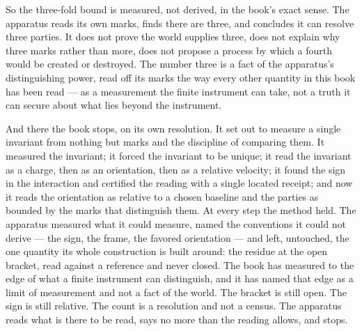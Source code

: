So the three-fold bound is measured, not derived, in the book's exact sense. The apparatus reads
its own marks, finds there are three, and concludes it can resolve three parties. It does not
prove the world supplies three, does not explain why three marks rather than more, does not
propose a process by which a fourth would be created or destroyed. The number three is a fact of
the apparatus's distinguishing power, read off its marks the way every other quantity in this
book has been read --- as a measurement the finite instrument can take, not a truth it can secure
about what lies beyond the instrument.

And there the book stops, on its own resolution. It set out to measure a single invariant from
nothing but marks and the discipline of comparing them. It measured the invariant; it forced the
invariant to be unique; it read the invariant as a charge, then as an orientation, then as a
relative velocity; it found the sign in the interaction and certified the reading with a single
located receipt; and now it reads the orientation as relative to a chosen baseline and the
parties as bounded by the marks that distinguish them. At every step the method held. The
apparatus measured what it could measure, named the conventions it could not derive --- the sign,
the frame, the favored orientation --- and left, untouched, the one quantity its whole
construction is built around: the residue at the open bracket, read against a reference and
never closed. The book has measured to the edge of what a finite instrument can distinguish, and
it has named that edge as a limit of measurement and not a fact of the world. The bracket is
still open. The sign is still relative. The count is a resolution and not a census. The
apparatus reads what is there to be read, says no more than the reading allows, and stops.
